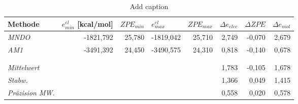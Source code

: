 \begin{table}[htbp]
  \centering
  \caption{Add caption}
    \begin{tabular}{lrrrrrrr}
    \toprule
    \textbf{Methode} & \multicolumn{1}{l}{\boldmath{}\textbf{$e^{el}_{min}$ [kcal/mol]}\unboldmath{}} & \multicolumn{1}{l}{\boldmath{}\textbf{$ZPE_{min}$}\unboldmath{}} & \multicolumn{1}{l}{\boldmath{}\textbf{$e^{el}_{max}$}\unboldmath{}} & \multicolumn{1}{l}{\boldmath{}\textbf{$ZPE_{max}$}\unboldmath{}} & \multicolumn{1}{l}{\boldmath{}\textbf{$\Delta e_{elec}$}\unboldmath{}} & \multicolumn{1}{l}{\boldmath{}\textbf{$\Delta ZPE$}\unboldmath{}} & \multicolumn{1}{l}{\boldmath{}\textbf{$\Delta e_{mol}$}\unboldmath{}} \\
    \midrule
    \textit{MNDO} & -1821,792 & 25,780 & -1819,042 & 25,710 & 2,749 & -0,070 & 2,679 \\
    \textit{AM1} & -3491,392 & 24,450 & -3490,575 & 24,310 & 0,818 & -0,140 & 0,678 \\
          &       &       &       &       &       &       &  \\
          &       &       &       &       &       &       &  \\
    \midrule
    \midrule
    \textit{Mittelwert} &       &       &       &       & 1,783 & -0,105 & 1,678 \\
    \textit{Stabw.} &       &       &       &       & 1,366 & 0,049 & 1,415 \\
    \textit{Präzision MW.} &       &       &       &       & 0,558 & 0,020 & 0,578 \\
    \bottomrule
    \end{tabular}%
  \label{tab:addlabel}%
\end{table}%
